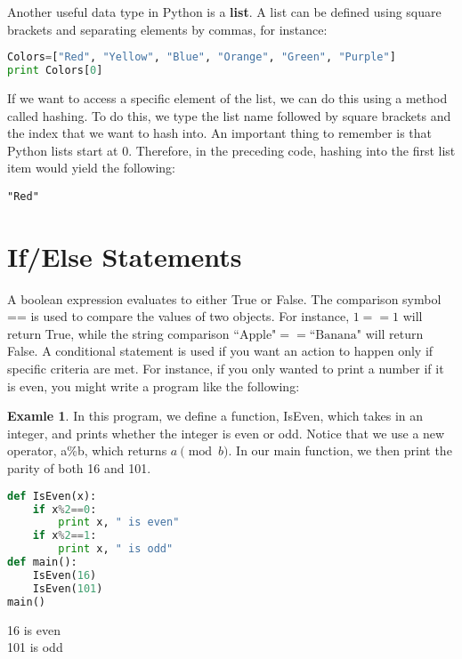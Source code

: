 \documentclass[12pt,openany]{book} %
\theoremstyle{definition}
\newtheorem{soln}{\textbf{Exam\smash{p}le} \nolinebreak }[section]
\newcounter{code}[section]
\begin{document}
Another useful data type in Python is a \textbf{list}.  A list can be defined using square brackets and separating elements by commas, for instance:  
\begin{code}{}{}
\begin{lstlisting}[language=Python]
Colors=["Red", "Yellow", "Blue", "Orange", "Green", "Purple"]
print Colors[0]
\end{lstlisting}  \end{code}
If we want to access a specific element of the list, we can do this using a method called hashing.  To do this, we type the list name followed by square brackets and the index that we want to hash into. An important thing to remember is that Python lists start at 0. Therefore, in the preceding code, hashing into the first list item would yield the following:
\begin{out}{}{}
\begin{lstlisting}
"Red"
\end{lstlisting} \end{out}
\section{If/Else Statements}
A boolean expression evaluates to either True or False.  The comparison symbol == is used to compare the values of two objects.  For instance, $1==1$ will return True, while the string comparison $\text{``Apple"}==\text{``Banana"}$ will return False.  A conditional statement is used if you want an action to happen only if specific criteria are met.  For instance, if you only wanted to print a number if it is even, you might write a program like the following:
\begin{soln}  In this program, we define a function, IsEven, which takes in an integer, and prints whether the integer is even or odd.  Notice that we use a new operator, a\%b, which returns $a\pmod{b}$.  In our main function, we then print the parity of both 16 and 101.  
\end{soln}  
\begin{code}{}{}
\begin{lstlisting}[language=Python]
def IsEven(x):
	if x%2==0:
		print x, " is even"
	if x%2==1:
		print x, " is odd"
def main():
	IsEven(16)
	IsEven(101)
main()
\end{lstlisting} \end{code}
\begin{out}{}{} 16 is even \\ 101 is odd
\end{out} 
\end{document}
